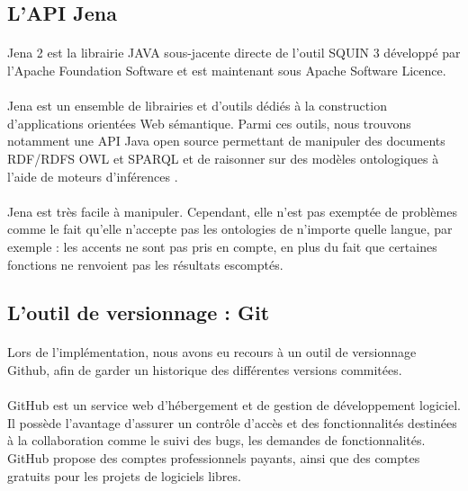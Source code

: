 \documentclass[12pt, a4paper, oneside]{book}
\begin{document}
\subsection{L'API Jena}
\paragraph{}
Jena 2 est la librairie JAVA sous-jacente directe de l'outil SQUIN 3 développé par l'Apache Foundation Software et est maintenant sous Apache Software Licence. 
\paragraph{}
Jena est un ensemble de librairies et d'outils dédiés à la construction d'applications orientées Web sémantique. Parmi ces outils, nous trouvons notamment une API Java open source permettant de manipuler des documents
RDF/RDFS OWL et SPARQL et de raisonner sur des modèles ontologiques à l'aide de moteurs d'inférences \citep{jena}. 
\paragraph{}
Jena est très facile à manipuler. Cependant, elle n'est pas exemptée de problèmes comme le fait qu'elle n'accepte pas les ontologies de n'importe quelle langue, par exemple : les accents ne sont pas pris en compte, en plus du fait que certaines fonctions ne renvoient pas les résultats escomptés.

\subsection{L'outil de versionnage : Git}
\paragraph{}
Lors de l'implémentation, nous avons eu recours à un outil de versionnage Github, afin de garder un historique des différentes versions commitées.
\paragraph{}
GitHub est un service web d'hébergement et de gestion de développement logiciel. Il possède l'avantage d'assurer un contrôle d'accès et des fonctionnalités destinées à la collaboration comme le suivi des bugs, les demandes de fonctionnalités. GitHub propose des comptes professionnels payants, ainsi que des comptes gratuits pour les projets de logiciels libres.
\end{document}
